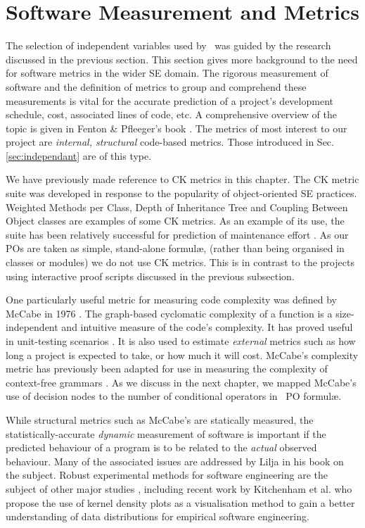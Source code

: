 \section{Software Measurement and Metrics}
\label{sec:lrmm}

The selection of independent variables used by \where~was guided by the research discussed in the previous section. 
This section gives more background to the need for software metrics in the wider SE domain.
The rigorous measurement of software and the definition of metrics to group and comprehend these measurements is vital for the accurate prediction of a project's development schedule, cost, associated lines of code, etc. 
A comprehensive overview of the topic is given in Fenton \& Pfleeger's book \cite{FentonPfleeger}. 
The metrics of most interest to our project are \textit{internal, structural} code-based metrics. 
Those introduced in Sec. \ref{sec:independant} are of this type.

We have previously made reference to CK metrics in this chapter. 
The CK metric suite was developed in response to the popularity of object-oriented SE practices. 
Weighted Methods per Class, Depth of Inheritance Tree and Coupling Between Object classes are examples of some CK metrics. 
As an example of its use, the suite has been relatively successful for prediction of maintenance effort \cite{LiHenry}. 
As our POs are taken as simple, stand-alone formul\ae, (rather than being organised in classes or modules) we do not use CK metrics. 
This is in contrast to the projects using interactive proof scripts discussed in the previous subsection. 

One particularly useful metric for measuring code complexity was defined by McCabe in 1976 \cite{McCabe}. The graph-based cyclomatic complexity of a function is a size-independent and intuitive measure of the code's complexity. It has proved useful in unit-testing scenarios \cite{McCabeTesting}. It is also used to estimate \textit{external} metrics such as how long a project is expected to take, or how much it will cost.  McCabe's complexity metric has previously been adapted for use in measuring the complexity of context-free grammars \cite{nuimeprn6458}. As we discuss in the next chapter, we mapped McCabe's use of decision nodes to the number of conditional operators in \why~PO formul\ae.

While structural metrics such as McCabe's are statically measured, the statistically-accurate \textit{dynamic} measurement of software is important if the predicted behaviour of a program is to be related to the \textit{actual} observed behaviour. Many of the associated issues are addressed by Lilja \cite{LiljaJ} in his book on the subject. Robust experimental methods for software engineering are the subject of other major studies \cite{AdvancedESE}, including recent work by Kitchenham et al. \cite{Kitchenham2016} who propose the use of kernel density plots as a visualisation method to gain a better understanding of data distributions for empirical software engineering.

